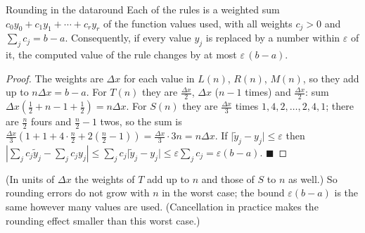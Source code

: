\documentclass[11pt]{article}
\begin{document}
\begin{thm}{Rounding in the data}{round}
Each of the rules is a weighted sum $c_0y_0+c_1y_1+\cdots+c_ry_r$ of the function values used, with all weights $c_j>0$ and $\sum_jc_j=b-a$. Consequently, if every value $y_j$ is replaced by a number within $\varepsilon$ of it, the computed value of the rule changes by at most $\varepsilon\,(b-a)$.
\end{thm}
\begin{proof}
The weights are $\Delta x$ for each value in $L(n)$, $R(n)$, $M(n)$, so they add up to $n\Delta x=b-a$. For $T(n)$ they are $\frac{\Delta x}2$, $\Delta x$ ($n-1$ times) and $\frac{\Delta x}2$: sum $\Delta x\left(\frac12+n-1+\frac12\right)=n\Delta x$. For $S(n)$ they are $\frac{\Delta x}3$ times $1,4,2,\ldots,2,4,1$; there are $\frac n2$ fours and $\frac n2-1$ twos, so the sum is $\frac{\Delta x}3\left(1+1+4\cdot\frac n2+2\left(\frac n2-1\right)\right)=\frac{\Delta x}3\cdot3n=n\Delta x$. If $\lvert\tilde y_j-y_j\rvert\le\varepsilon$ then $\left\lvert\sum_jc_j\tilde y_j-\sum_jc_jy_j\right\rvert\le\sum_jc_j\lvert\tilde y_j-y_j\rvert\le\varepsilon\sum_jc_j=\varepsilon(b-a)$. $\blacksquare$
\end{proof}

(In units of $\Delta x$ the weights of $T$ add up to $n$ and those of $S$ to $n$ as well.) So rounding errors do not grow with $n$ in the worst case; the bound $\varepsilon(b-a)$ is the same however many values are used. (Cancellation in practice makes the rounding effect smaller than this worst case.)
\end{document}
